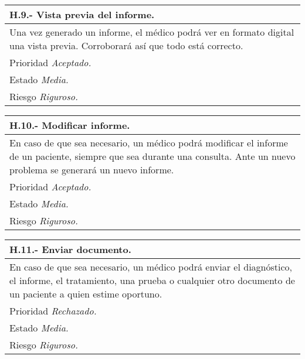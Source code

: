 \documentclass[a4paper,oneside,11pt]{book}
\begin{document}
\begin{center}
\begin{tabulary}{15cm}{|L|}
	\hline
		\bf{H.9.- Vista previa del informe.} \\
	\hline
		Una vez generado un informe, el médico podrá ver en formato digital una vista previa. Corroborará así que todo está correcto. \\
	\hline
		Prioridad \textit{Aceptado.} \\
	\hline
		Estado \textit{Media.} \\
	\hline
		Riesgo \textit{Riguroso.} \\
	\hline
\end{tabulary}
\end{center}

\begin{center}
\begin{tabulary}{15cm}{|L|}
	\hline
		\bf{H.10.- Modificar informe.} \\
	\hline
		En caso de que sea necesario, un médico podrá modificar el informe de un paciente, siempre que sea durante una consulta. Ante un nuevo problema se generará un nuevo informe.\\
	\hline
		Prioridad \textit{Aceptado.} \\
	\hline
		Estado \textit{Media.} \\
	\hline
		Riesgo \textit{Riguroso.} \\
	\hline
\end{tabulary}
\end{center}

\begin{center}
\begin{tabulary}{15cm}{|L|}
	\hline
		\bf{H.11.- Enviar documento.} \\
	\hline
		En caso de que sea necesario, un médico podrá enviar el diagnóstico, el informe, el tratamiento, una prueba o cualquier otro documento de un paciente a quien estime oportuno. \\
	\hline
		Prioridad \textit{Rechazado.} \\
	\hline
		Estado \textit{Media.} \\
	\hline
		Riesgo \textit{Riguroso.} \\
	\hline
\end{tabulary}
\end{center}
\end{document}

